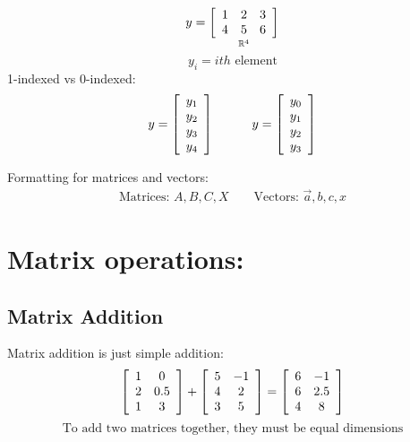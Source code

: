 \documentclass{article}
\begin{document}
\[
y = \underset{\mathbb{R}^4} {
    \left[\begin{array}[]{ccc}
        1 & 2 & 3\\
        4 & 5 & 6\\
    \end{array}\right]
}
\]
\[
    y_i = ith \text{ element}
\]
1-indexed vs 0-indexed:
\begin{align*}
    y = 
    \left[\begin{array}[]{c}
        y_1\\
        y_2\\
        y_3\\
        y_4
    \end{array}\right]
    \quad
    \quad
    \quad
    y = 
    \left[\begin{array}[]{c}
        y_0\\
        y_1\\
        y_2\\
        y_3
    \end{array}\right]
\end{align*}

Formatting for matrices and vectors:
\begin{align*}
    \text{Matrices: } A, B, C, X
    \quad \quad
    \text{Vectors: } \vec{a}, b, c, x
\end{align*}

\section{Matrix operations:}
\subsection{Matrix Addition}
Matrix addition is just simple addition:
\[
\left[\begin{array}[]{cc}
    1 & 0 \\
    2 & 0.5 \\
    1 & 3 \\
\end{array}\right]
+
\left[\begin{array}[]{cc}
    5 & -1 \\
    4 & 2 \\
    3 & 5 \\
\end{array}\right]
=
\left[\begin{array}[]{cc}
    6 & -1 \\
    6 & 2.5 \\
    4 & 8 \\
\end{array}\right]
\]
\[
\text{To add two matrices together, they must be equal dimensions}
\]
\end{document}
